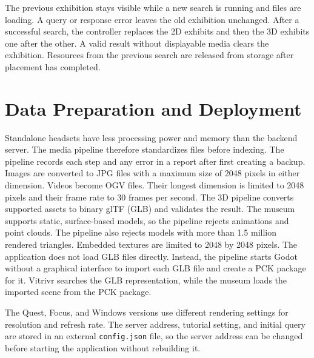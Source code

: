 The previous exhibition stays visible while a new search is running and files are loading. A query or response error leaves the old exhibition unchanged. After a successful search, the controller replaces the 2D exhibits and then the 3D exhibits one after the other. A valid result without displayable media clears the exhibition. Resources from the previous search are released from storage after placement has completed.

\section{Data Preparation and Deployment}
\label{sec:implementation-deployment}

Standalone headsets have less processing power and memory than the backend server. The media pipeline therefore standardizes files before indexing. The pipeline records each step and any error in a report after first creating a backup. Images are converted to JPG files with a maximum size of 2048 pixels in either dimension. Videos become OGV files. Their longest dimension is limited to 2048 pixels and their frame rate to 30 frames per second. The 3D pipeline converts supported assets to binary glTF (GLB) and validates the result. The museum supports static, surface-based models, so the pipeline rejects animations and point clouds. The pipeline also rejects models with more than 1.5 million rendered triangles. Embedded textures are limited to 2048 by 2048 pixels. The application does not load GLB files directly. Instead, the pipeline starts Godot without a graphical interface to import each GLB file and create a PCK package for it. Vitrivr searches the GLB representation, while the museum loads the imported scene from the PCK package.

The Quest, Focus, and Windows versions use different rendering settings for resolution and refresh rate. The server address, tutorial setting, and initial query are stored in an external \texttt{config.json} file, so the server address can be changed before starting the application without rebuilding it.

\endgroup
